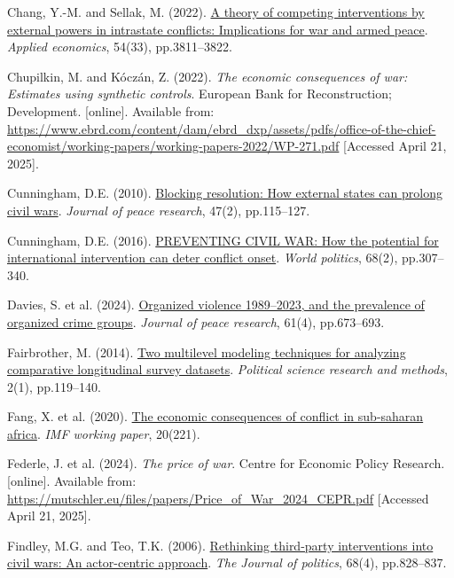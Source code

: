 \documentclass[
]{article}
\newlength{\cslhangindent}
\newenvironment{CSLReferences}[2] %
 {\begin{list}{}{%
  \setlength{\itemindent}{0pt}
  \setlength{\leftmargin}{0pt}
  \setlength{\parsep}{0pt}
  \ifodd #1
   \setlength{\leftmargin}{\cslhangindent}
   \setlength{\itemindent}{-1\cslhangindent}
  \fi
  \setlength{\itemsep}{#2\baselineskip}}}
 {\end{list}}
\begin{document}
\begin{CSLReferences}{0}{1}
Chang, Y.-M. and Sellak, M. (2022).
\href{https://doi.org/10.1080/00036846.2021.2016588}{A theory of
competing interventions by external powers in intrastate conflicts:
Implications for war and armed peace}. \emph{Applied economics}, 54(33),
pp.3811--3822.

Chupilkin, M. and Kóczán, Z. (2022). \emph{The economic consequences of
war: Estimates using synthetic controls}. European Bank for
Reconstruction; Development. {[}online{]}. Available from:
\url{https://www.ebrd.com/content/dam/ebrd_dxp/assets/pdfs/office-of-the-chief-economist/working-papers/working-papers-2022/WP-271.pdf}
{[}Accessed April 21, 2025{]}.

Cunningham, D.E. (2010).
\href{https://doi.org/10.1177/0022343309353488}{Blocking resolution: How
external states can prolong civil wars}. \emph{Journal of peace
research}, 47(2), pp.115--127.

Cunningham, D.E. (2016).
\href{https://doi.org/10.1017/S0043887115000404}{PREVENTING CIVIL WAR:
How the potential for international intervention can deter conflict
onset}. \emph{World politics}, 68(2), pp.307--340.

Davies, S. et al. (2024).
\href{https://doi.org/10.1177/00223433241262912}{Organized violence
1989--2023, and the prevalence of organized crime groups}. \emph{Journal
of peace research}, 61(4), pp.673--693.

Fairbrother, M. (2014). \href{https://doi.org/10.1017/psrm.2013.24}{Two
multilevel modeling techniques for analyzing comparative longitudinal
survey datasets}. \emph{Political science research and methods}, 2(1),
pp.119--140.

Fang, X. et al. (2020).
\href{https://doi.org/10.5089/9781513559667.001}{The economic
consequences of conflict in sub-saharan africa}. \emph{IMF working
paper}, 20(221).

Federle, J. et al. (2024). \emph{The price of war}. Centre for Economic
Policy Research. {[}online{]}. Available from:
\url{https://mutschler.eu/files/papers/Price_of_War_2024_CEPR.pdf}
{[}Accessed April 21, 2025{]}.

Findley, M.G. and Teo, T.K. (2006).
\href{https://doi.org/10.1111/j.1468-2508.2006.00473.x}{Rethinking
third-party interventions into civil wars: An actor-centric approach}.
\emph{The Journal of politics}, 68(4), pp.828--837.


\end{CSLReferences}
\end{document}
